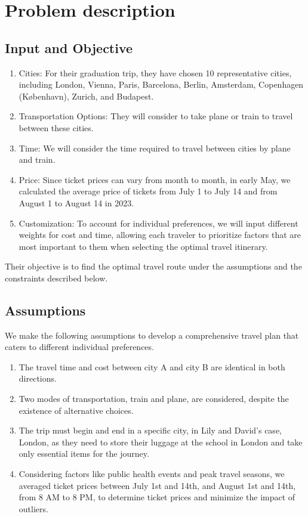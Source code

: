 \documentclass{article}
\begin{document}
\section{Problem description}

\subsection{Input and Objective}

\begin{enumerate}
  \item Cities: For their graduation trip, they have chosen 10 representative cities,
        including London, Vienna, Paris, Barcelona, Berlin, Amsterdam, Copenhagen
        (København), Zurich, and Budapest.
  \item Transportation Options: They will consider to take plane or train to travel
        between these cities.
  \item Time: We will consider the time required to travel between cities by plane and
        train.
  \item Price: Since ticket prices can vary from month to month, in early May, we
        calculated the average price of tickets from July 1 to July 14 and from August
        1 to August 14 in 2023.
  \item Customization: To account for individual preferences, we will input different
        weights for cost and time, allowing each traveler to prioritize factors that
        are most important to them when selecting the optimal travel itinerary.
\end{enumerate}

Their objective is to find the optimal travel route under the assumptions and
the constraints described below.

\subsection{Assumptions}

We make the following assumptions to develop a comprehensive travel plan that caters to different individual preferences.

\begin{enumerate}
  \item The travel time and cost between city A and city B are identical in both
        directions.
  \item Two modes of transportation, train and plane, are considered, despite the
        existence of alternative choices.
  \item The trip must begin and end in a specific city, in Lily and David's case,
        London, as they need to store their luggage at the school in London and take
        only essential items for the journey.
  \item Considering factors like public health events and peak travel seasons, we
        averaged ticket prices between July 1st and 14th, and August 1st and 14th, from
        8 AM to 8 PM, to determine ticket prices and minimize the impact of outliers.
\end{enumerate}
\end{document}
